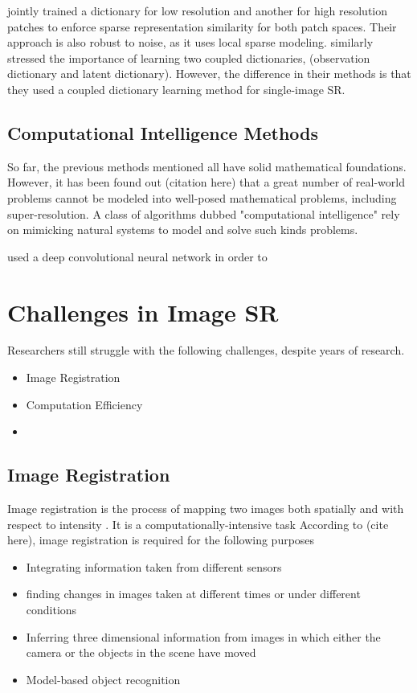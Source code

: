 \cite{Wright2010} jointly trained a dictionary for low resolution and another for high resolution patches to enforce sparse representation similarity for both patch spaces. Their approach is also robust to noise, as it uses local sparse modeling.
\cite{Yang2012} similarly stressed the importance of learning two coupled dictionaries, (observation dictionary and latent dictionary). However, the difference in their methods is that they used a coupled dictionary learning method for single-image SR. 	


\subsection{Computational Intelligence Methods}
So far, the previous methods mentioned all have solid mathematical foundations.
However, it has been found out (citation here) that a great number of real-world problems cannot be modeled into well-posed mathematical problems, including super-resolution.
A class of algorithms dubbed "computational intelligence" rely on mimicking natural systems to model and solve such kinds problems.

\cite{Dong2014} used a deep convolutional neural network in order to 


\section{Challenges in Image SR}
Researchers still struggle with the following challenges, despite years of research.
\begin{itemize}
	\item Image Registration
	\item Computation Efficiency
	\item 
\end{itemize}
\subsection{Image Registration}
Image registration is the process of mapping two images both spatially and with respect to intensity \citep{Brown1992}. It is a computationally-intensive task \citep{Yang2010a}
According to (cite here), image registration is required for the following purposes
\begin{itemize}
	\item Integrating information taken from different sensors
	\item finding changes in images taken at different times or under different conditions
	\item Inferring three dimensional information from images in which either the camera or the objects in the scene have moved
	\item Model-based object recognition
\end{itemize}

